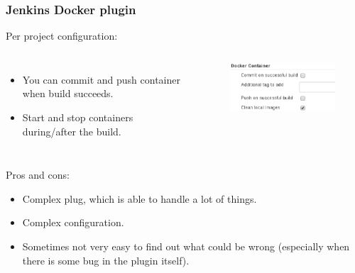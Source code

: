 \documentclass[10pt,utf8]{beamer}
\newcommand*\proItem{\item[\color{darkGreen}\scalebox{0.9}{\LARGE{\textbf{+}}}]}
\newcommand*\conItem{\item[\color{darkRed}\scalebox{0.9}{\LARGE{\textbf{\textendash}}}]}
\begin{document}
\begin{frame}
	\frametitle{Jenkins Docker plugin}
	Per project configuration:
	\begin{columns}
		\begin{itemize}
			\item You can commit and push container when build succeeds.
			\item Start and stop containers during/after the build.
		\end{itemize}
		
	\begin{figure}
			\centering
			\hspace{-1cm}
			\includegraphics[width=6cm]{./img/docker_plugin_cfg3.eps}
		\end{figure}
	\end{columns}
	
	\vspace{1cm}
	Pros and cons:
	\begin{itemize}
		\proItem Complex plug, which is able to handle a lot of things.
		\conItem Complex configuration.
		\conItem Sometimes not very easy to find out what could be wrong (especially when there is some bug in the plugin itself).
	\end{itemize}
\end{frame}
\end{document}
